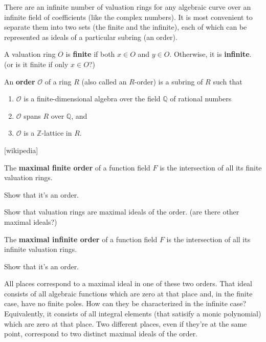 There are an infinite number of valuation rings for any algebraic curve over an infinite field
of coefficients (like the complex numbers).  It is most convenient to separate them
into two sets (the finite and the infinite), each of which can be represented as ideals
of a particular subring (an order).

\begin{definition}
A valuation ring $O$ is {\bf finite} if both $x \in O$ and $y \in O$.  Otherwise, it is {\bf infinite}.
(or is it finite if only $x \in O$?)
\end{definition}

\begin{definition}
An {\bf order} $\mathcal {O}$ of a ring $R$ (also called an $R$-order) is a subring of $R$ such that
\begin{enumerate}
\item $\mathcal {O}$ is a finite-dimensional algebra over the field $\mathbb {Q}$ of rational numbers
\item $\mathcal {O}$ spans $R$ over $\mathbb {Q}$, and
\item $\mathcal {O}$ is a $\mathbb {Z}$-lattice in $R$.
\end{enumerate}
[wikipedia]
\end{definition}

\begin{definition}
The {\bf maximal finite order} of a function field $F$ is the intersection of all its finite valuation rings.
\end{definition}

Show that it's an order.

Show that valuation rings are maximal ideals of the order.  (are there other maximal ideals?)

\begin{definition}
The {\bf maximal infinite order} of a function field $F$ is the intersection of all its infinite valuation rings.
\end{definition}

Show that it's an order.

All places correspond to a maximal ideal in one of these two orders.
That ideal consists of all algebraic functions which are zero at that place and,
in the finite case, have no finite poles.  How can they be characterized in the infinite case?
Equivalently, it consists of all integral elements (that satisify a monic polynomial) which are
zero at that place.
Two different places, even if they're at the same point, correspond to two distinct maximal ideals of the order.

